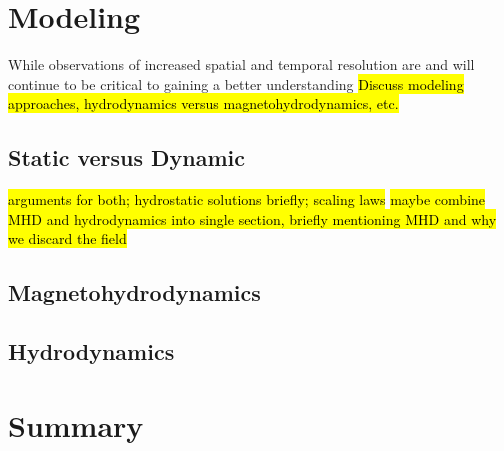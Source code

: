 \section{Modeling}
\label{sec:modeling}
%
\par While observations of increased spatial and temporal resolution are and will continue to be critical to gaining a better understanding 
\hl{Discuss modeling approaches, hydrodynamics versus magnetohydrodynamics, etc.}
\subsection{Static versus Dynamic}
\label{subsec:static_v_dynamic}
%
\hl{arguments for both; hydrostatic solutions briefly; scaling laws}
\hl{maybe combine MHD and hydrodynamics into single section, briefly mentioning MHD and why we discard the field}
\subsection{Magnetohydrodynamics}
\label{subsec:mhd}
%
\subsection{Hydrodynamics}
\label{subsec:hydro}
%
%
\section{Summary}
